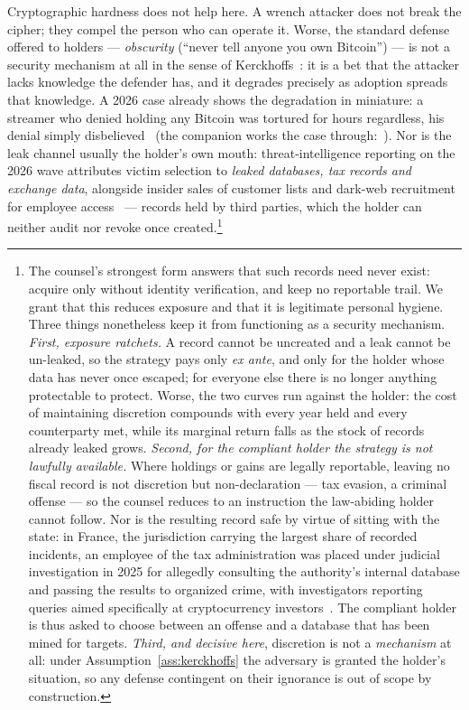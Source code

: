 Cryptographic hardness does not help here. A wrench attacker does not break the
cipher; they compel the person who can operate it. Worse, the standard defense
offered to holders --- \emph{obscurity} (``never tell anyone you own
Bitcoin'') --- is not a security mechanism at all in the sense of
Kerckhoffs~\cite{kerckhoffs1883}: it is a bet that the attacker lacks knowledge
the defender has, and it degrades precisely as adoption spreads that knowledge. A
2026 case already shows the degradation in miniature: a streamer who denied holding
any Bitcoin was tortured for hours regardless, his denial simply
disbelieved~\cite{ratirl} (the companion works the case
through:~\cite[\S7]{denial-spiral}). Nor is the
leak channel usually the holder's own mouth: threat-intelligence reporting on the
2026 wave attributes victim selection to \emph{leaked databases, tax records and
exchange data}, alongside insider sales of customer lists and dark-web recruitment
for employee access~\cite{certik-intel3d-h1-2026} --- records held by third
parties, which the holder can neither audit nor revoke once
created.\footnote{The counsel's strongest form answers that such records need
never exist: acquire only without identity verification, and keep no reportable
trail. We grant that this reduces exposure and that it is legitimate personal
hygiene. Three things nonetheless keep it from functioning as a security
mechanism. \emph{First, exposure ratchets.} A record cannot be uncreated and a
leak cannot be un-leaked, so the strategy pays only \emph{ex ante}, and only for
the holder whose data has never once escaped; for everyone else there is no
longer anything protectable to protect. Worse, the two curves run against the
holder: the cost of maintaining discretion compounds with every year held and
every counterparty met, while its marginal return falls as the stock of records
already leaked grows. \emph{Second, for the compliant holder the strategy is not
lawfully available.} Where holdings or gains are legally reportable, leaving no
fiscal record is not discretion but non-declaration --- tax evasion, a criminal
offense --- so the counsel reduces to an instruction the law-abiding holder
cannot follow. Nor is the resulting record safe by virtue of sitting with the
state: in France, the jurisdiction carrying the largest share of recorded
incidents, an employee of the tax administration was placed under judicial
investigation in 2025 for allegedly consulting the authority's internal database
and passing the results to organized crime, with investigators reporting queries
aimed specifically at cryptocurrency investors~\cite{fisc-leak-2026}. The
compliant holder is thus asked to choose between an offense and a database that
has been mined for targets. \emph{Third, and decisive here}, discretion is not a
\emph{mechanism} at all: under Assumption~\ref{ass:kerckhoffs} the adversary is
granted the holder's situation, so any defense contingent on their ignorance is
out of scope by construction.}
